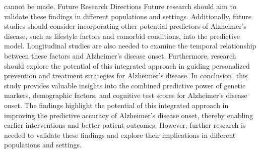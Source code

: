 \documentclass[conference]{IEEEtran}
\begin{document}
cannot be made. Future Research Directions Future research should aim to validate these findings in different populations and settings. Additionally, future studies should consider incorporating other potential predictors of Alzheimer's disease, such as lifestyle factors and comorbid conditions, into the predictive model. Longitudinal studies are also needed to examine the temporal relationship between these factors and Alzheimer's disease onset. Furthermore, research should explore the potential of this integrated approach in guiding personalized prevention and treatment strategies for Alzheimer's disease. In conclusion, this study provides valuable insights into the combined predictive power of genetic markers, demographic factors, and cognitive test scores for Alzheimer's disease onset. The findings highlight the potential of this integrated approach in improving the predictive accuracy of Alzheimer's disease onset, thereby enabling earlier interventions and better patient outcomes. However, further research is needed to validate these findings and explore their implications in different populations and settings.
\end{document}
